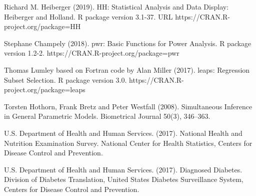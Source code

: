 \documentclass[letter,12pt]{article}
\begin{document}
	\begin{hangparas}{.5in}{1}
	  Richard M. Heiberger (2019). HH: Statistical Analysis and Data Display: Heiberger and Holland. R package version 3.1-37. URL https://CRAN.R-project.org/package=HH
	\end{hangparas}
	\begin{hangparas}{.5in}{1}
		Stephane Champely (2018). pwr: Basic Functions for Power Analysis. R package version 1.2-2. https://CRAN.R-project.org/package=pwr
	\end{hangparas}
	\begin{hangparas}{.5in}{1}
	  Thomas Lumley based on Fortran code by Alan Miller (2017). leaps: Regression Subset Selection. R package version 3.0. https://CRAN.R-project.org/package=leaps
	\end{hangparas}
	\begin{hangparas}{.5in}{1}
		Torsten Hothorn, Frank Bretz and Peter Westfall (2008). Simultaneous Inference in General Parametric Models. Biometrical Journal 50(3), 346--363.
	\end{hangparas}
	\begin{hangparas}{.5in}{1}
	  U.S. Department of Health and Human Services. (2017). National Health and Nutrition Examination Survey. National Center for Health Statistics, Centers for Disease Control and Prevention.
	\end{hangparas}
	\begin{hangparas}{.5in}{1}
	  U.S. Department of Health and Human Services. (2017). Diagnosed Diabetes. Division of Diabetes Translation, United States Diabetes Surveillance System, Centers for Disease Control and Prevention.
	\end{hangparas}
\end{document}
